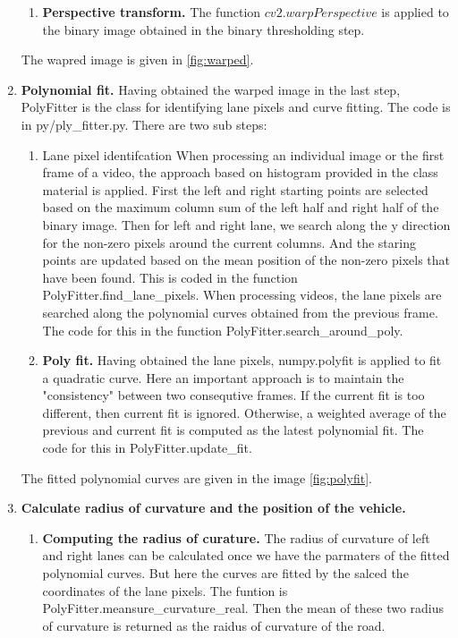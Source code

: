 \documentclass[12pt]{article}
\begin{document}
\begin{enumerate}
\begin{enumerate}
			\item \textbf{Perspective transform.} The function $cv2.warpPerspective$ is applied to the binary image obtained in the binary thresholding step.
		\end{enumerate}
	The wapred image is given in \ref{fig:warped}.
	
	\item \textbf{Polynomial fit.} Having obtained the warped image in the last step, PolyFitter is the class for identifying lane pixels and curve fitting. The code is in py/ply\_fitter.py. There are two sub steps:
		\begin{enumerate}
			\item {Lane pixel identifcation} When processing an individual image or the first frame of a video, the approach based on histogram provided in the class material is applied. First the left and right starting points are selected based on the maximum column sum of the left half and right half of the binary image. Then for left and right lane, we search along the y direction for the non-zero pixels around the current columns. And the staring points are updated based on the mean position of the non-zero pixels that have been found. This is coded in the function PolyFitter.find\_lane\_pixels. When processing videos, the lane pixels are searched along the polynomial curves obtained from the previous frame. The code for this in the function PolyFitter.search\_around\_poly.
			
			\item \textbf {Poly fit.} Having obtained the lane pixels, numpy.polyfit is applied to fit a quadratic curve. Here an important approach is to maintain the "consistency" between two consequtive frames. If the current fit is too different, then current fit is ignored. Otherwise, a weighted average of the previous and current fit is computed as the latest polynomial fit. The code for this in PolyFitter.update\_fit.
		\end{enumerate}
	The fitted polynomial curves are given in the image \ref{fig:polyfit}.
	
	
	\item \textbf{Calculate radius of curvature and the position of the vehicle.} 
		\begin{enumerate}
			\item \textbf{Computing the radius of curature.} The radius of curvature of left and right lanes can be calculated once we have the parmaters of the fitted polynomial curves. But here the curves are fitted by the salced the coordinates of the lane pixels. The funtion is PolyFitter.meansure\_curvature\_real. Then the mean of these two radius of curvature is returned as the raidus of curvature of the road. 
			

\end{enumerate}
\end{enumerate}
\end{document}
